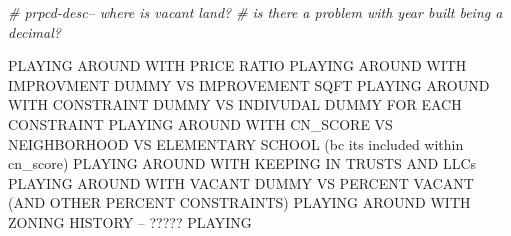 \documentclass[]{article}
\newenvironment{Shaded}{\begin{snugshade}}{\end{snugshade}}
\newcommand{\CommentTok}[1]{\textcolor[rgb]{0.56,0.35,0.01}{\textit{#1}}}
\begin{document}
\begin{Shaded}
\begin{Highlighting}[]
\CommentTok{# prpcd-desc-- where is vacant land?}
\CommentTok{# is there a problem with year built being a decimal?}
\end{Highlighting}
\end{Shaded}

PLAYING AROUND WITH PRICE RATIO PLAYING AROUND WITH IMPROVMENT DUMMY VS
IMPROVEMENT SQFT PLAYING AROUND WITH CONSTRAINT DUMMY VS INDIVUDAL DUMMY
FOR EACH CONSTRAINT PLAYING AROUND WITH CN\_SCORE VS NEIGHBORHOOD VS
ELEMENTARY SCHOOL (bc its included within cn\_score) PLAYING AROUND WITH
KEEPING IN TRUSTS AND LLCs PLAYING AROUND WITH VACANT DUMMY VS PERCENT
VACANT (AND OTHER PERCENT CONSTRAINTS) PLAYING AROUND WITH ZONING
HISTORY -- ????? PLAYING
\end{document}
